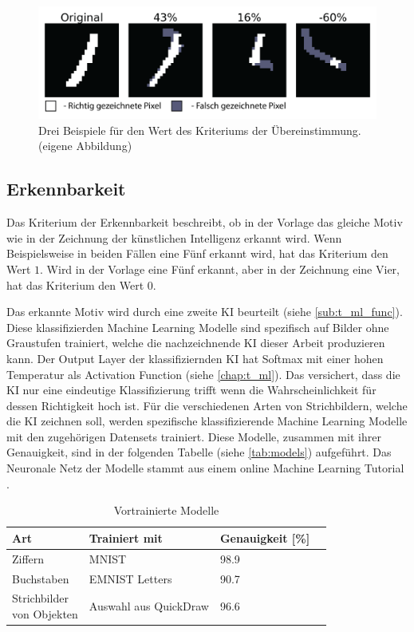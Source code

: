 \begin{figure}[!ht]
 \centering
 \includegraphics[width=\textwidth]{images/methode/ubereinstimm.png}
 \caption{Drei Beispiele für den Wert des Kriteriums der Übereinstimmung. (eigene Abbildung)}\label{fig:ubereinstimmung}
\end{figure}

\subsection{Erkennbarkeit}\label{sub:m_eval_rec}
Das Kriterium der Erkennbarkeit beschreibt, ob in der Vorlage das gleiche Motiv
wie in der Zeichnung der künstlichen Intelligenz erkannt wird. Wenn
Beispielsweise in beiden Fällen eine Fünf erkannt wird, hat das Kriterium den
Wert $1$. Wird in der Vorlage eine Fünf erkannt, aber in der Zeichnung eine
Vier, hat das Kriterium den Wert $0$.
 
Das erkannte Motiv wird durch eine zweite KI beurteilt (siehe
\ref{sub:t_ml_func}). Diese klassifizierden Machine Learning Modelle sind
spezifisch auf Bilder ohne Graustufen trainiert, welche die nachzeichnende KI
dieser Arbeit produzieren kann. Der Output Layer der klassifiziernden KI hat
Softmax mit einer hohen Temperatur als Activation Function (siehe
\ref{chap:t_ml}). Das versichert, dass die KI nur eine eindeutige
Klassifizierung trifft wenn die Wahrscheinlichkeit für dessen Richtigkeit hoch
ist. Für die verschiedenen Arten von Strichbildern, welche die KI zeichnen soll,
werden spezifische klassifizierende Machine Learning Modelle mit den zugehörigen
Datensets trainiert. Diese Modelle, zusammen mit ihrer Genauigkeit, sind in der
folgenden Tabelle (siehe \autoref{tab:models}) aufgeführt. Das Neuronale Netz
der Modelle stammt aus einem online Machine Learning Tutorial \cite{dataflair_handwritten_2020}.

\begin{table}[!ht]
 \centering  
 \begin{tabular}{|l|l|l|l|}
 \hline
     Art & Trainiert mit & Genauigkeit [\%]\\ \hline
     Ziffern & MNIST & 98.9\\ \hline
     Buchstaben  & EMNIST Letters & 90.7\\ \hline
     \makecell{Strichbilder\\von Objekten}  & Auswahl aus QuickDraw & 96.6\\ \hline
 \end{tabular}
 \caption{Vortrainierte Modelle}\label{tab:models}
\end{table}
 
